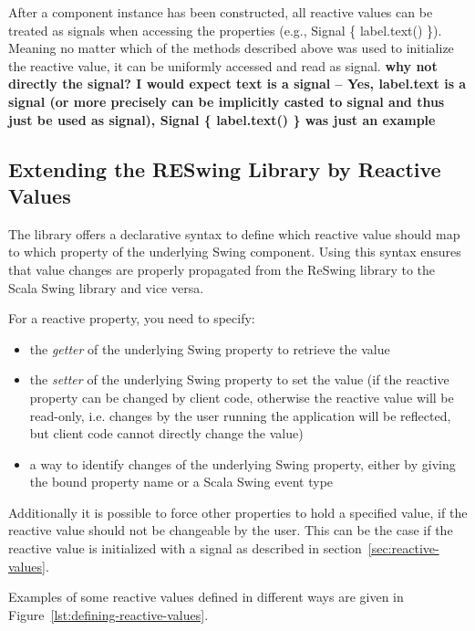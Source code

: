 \documentclass{scrartcl}
\newcommand{\code}[1]{{\fontfamily{cmtt}\small\selectfont#1}}
\begin{document}
After a component instance has been constructed, all reactive values
can be treated as signals when accessing the properties (e.g.,
\code{Signal \{ label.text() \}}). Meaning no matter which of the
methods described above was used to initialize the reactive value, it
can be uniformly accessed and read as signal.
{\bf why not directly the signal? I would expect text is a signal --
Yes, \code{label.text} is a signal (or more precisely can be
implicitly casted to signal and thus just be used as signal),
\code{Signal \{ label.text() \}} was just an example}



\subsection{Extending the RESwing Library by Reactive Values}
\label{sec:defining-reactive-values}
The library offers a declarative syntax to define which reactive value
should map to which property of the underlying Swing component. Using
this syntax ensures that value changes are properly propagated from
the ReSwing library to the Scala Swing library and vice versa.

For a reactive property, you need to specify:
\begin{itemize}
\item the \emph{getter} of the underlying Swing property to retrieve
  the value
\item the \emph{setter} of the underlying Swing property to set the
  value (if the reactive property can be changed by client code,
  otherwise the reactive value will be read-only, i.e. changes by the
  user running the application will be reflected, but client code
  cannot directly change the value)
\item a way to identify changes of the underlying Swing property,
  either by giving the bound property name or a Scala Swing event type
\end{itemize}
Additionally it is possible to force other properties to hold a
specified value, if the reactive value should not be changeable by the
user. This can be the case if the reactive value is initialized with a
signal as described in section~\ref{sec:reactive-values}.

Examples of some reactive values defined in different ways are given
in Figure~\ref{lst:defining-reactive-values}.
\end{document}
